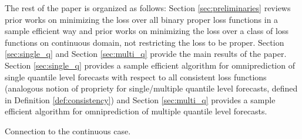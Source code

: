 The rest of the paper is organized as follows: Section \ref{sec:preliminaries} reviews prior works on minimizing the loss over all binary proper loss functions in a sample efficient way and prior works on minimizing the loss over a class of loss functions on continuous domain, not restricting the loss to be proper. Section \ref{sec:single_q} and Section \ref{sec:multi_q} provide the main results of the paper. Section \ref{sec:single_q} provides a sample efficient algorithm for omniprediction of single quantile level forecasts with respect to all consistent loss functions (analogous notion of propriety for single/multiple quantile level forecasts, defined in Definition \ref{def:consistency}) and Section \ref{sec:multi_q} provides a sample efficient algorithm for omniprediction of multiple quantile level forecasts.


\cite{kleinberg2023ucal}



{\color{blue}Connection to the continuous case.}


